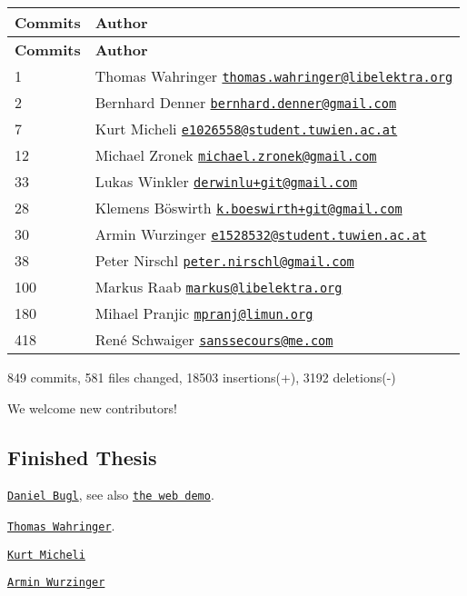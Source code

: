 \tabulinesep=1mm
\begin{longtabu} spread 0pt [c]{*{2}{|X[-1]}|}
\hline
\rowcolor{\tableheadbgcolor}\textbf{ Commits }&\textbf{ Author  }\\
\endfirsthead
\hline
\endfoot
\hline
\rowcolor{\tableheadbgcolor}\textbf{ Commits }&\textbf{ Author  }\\
 &Thomas Wahringer \href{mailto:thomas.wahringer@libelektra.org}{\tt thomas.\+wahringer@libelektra.\+org} \\
2 &Bernhard Denner \href{mailto:bernhard.denner@gmail.com}{\tt bernhard.\+denner@gmail.\+com} \\
7 &Kurt Micheli \href{mailto:e1026558@student.tuwien.ac.at}{\tt e1026558@student.\+tuwien.\+ac.\+at} \\
12 &Michael Zronek \href{mailto:michael.zronek@gmail.com}{\tt michael.\+zronek@gmail.\+com} \\
33 &Lukas Winkler \href{mailto:derwinlu+git@gmail.com}{\tt derwinlu+git@gmail.\+com} \\
28 &Klemens Böswirth \href{mailto:k.boeswirth+git@gmail.com}{\tt k.\+boeswirth+git@gmail.\+com} \\
30 &Armin Wurzinger \href{mailto:e1528532@student.tuwien.ac.at}{\tt e1528532@student.\+tuwien.\+ac.\+at} \\
38 &Peter Nirschl \href{mailto:peter.nirschl@gmail.com}{\tt peter.\+nirschl@gmail.\+com} \\
100 &Markus Raab \href{mailto:markus@libelektra.org}{\tt markus@libelektra.\+org} \\
180 &Mihael Pranjic \href{mailto:mpranj@limun.org}{\tt mpranj@limun.\+org} \\
418 &René Schwaiger \href{mailto:sanssecours@me.com}{\tt sanssecours@me.\+com} \\
\end{longtabu}
849 commits, 581 files changed, 18503 insertions(+), 3192 deletions(-\/)

We welcome new contributors!

\subsection*{Finished Thesis}


\begin{DoxyItemize}
\item \href{https://www.libelektra.org/ftp/elektra/publications/bugl2018web.pdf}{\tt Daniel Bugl}, see also \href{https://webdemo.libelektra.org/}{\tt the web demo}.
\item \href{https://www.libelektra.org/ftp/elektra/publications/wahringer2018notification.pdf}{\tt Thomas Wahringer}.
\item \href{https://www.libelektra.org/ftp/elektra/publications/micheli2018hybrid.pdf}{\tt Kurt Micheli}
\item \href{http://repositum.tuwien.ac.at/urn:nbn:at:at-ubtuw:1-115452}{\tt Armin Wurzinger}
\end{DoxyItemize}


